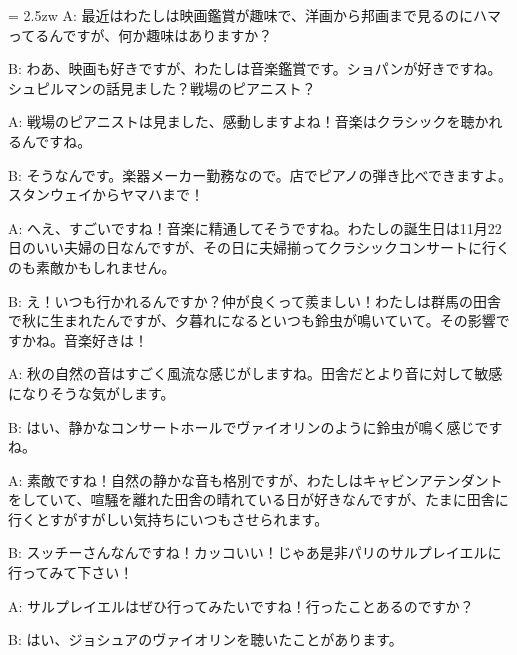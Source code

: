 \documentclass[11pt]{amsart}
\title{}
\author{}
\newenvironment{hangall}[1]{\hangindent = 2.5zw\everypar{\hangindent = 2.5zw}}{}
\begin{document}
\maketitle
\begin{hangall}{}%
A: 最近はわたしは映画鑑賞が趣味で、洋画から邦画まで見るのにハマってるんですが、何か趣味はありますか？

B: わあ、映画も好きですが、わたしは音楽鑑賞です。ショパンが好きですね。シュピルマンの話見ました？戦場のピアニスト？

A: 戦場のピアニストは見ました、感動しますよね！音楽はクラシックを聴かれるんですね。

B: そうなんです。楽器メーカー勤務なので。店でピアノの弾き比べできますよ。スタンウェイからヤマハまで！

A: へえ、すごいですね！音楽に精通してそうですね。わたしの誕生日は11月22日のいい夫婦の日なんですが、その日に夫婦揃ってクラシックコンサートに行くのも素敵かもしれません。

B: え！いつも行かれるんですか？仲が良くって羨ましい！わたしは群馬の田舎で秋に生まれたんですが、夕暮れになるといつも鈴虫が鳴いていて。その影響ですかね。音楽好きは！

A: 秋の自然の音はすごく風流な感じがしますね。田舎だとより音に対して敏感になりそうな気がします。

B: はい、静かなコンサートホールでヴァイオリンのように鈴虫が鳴く感じですね。

A: 素敵ですね！自然の静かな音も格別ですが、わたしはキャビンアテンダントをしていて、喧騒を離れた田舎の晴れている日が好きなんですが、たまに田舎に行くとすがすがしい気持ちにいつもさせられます。

B: スッチーさんなんですね！カッコいい！じゃあ是非パリのサルプレイエルに行ってみて下さい！

A: サルプレイエルはぜひ行ってみたいですね！行ったことあるのですか？

B: はい、ジョシュアのヴァイオリンを聴いたことがあります。
\end{hangall}
\end{document}
